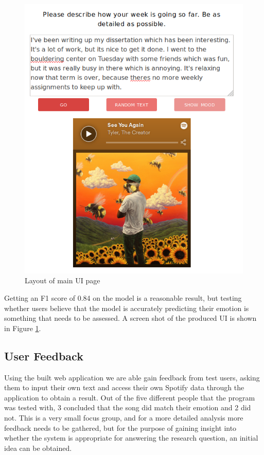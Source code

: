 \begin{figure}[ht]
\centering
\includegraphics[scale=0.4]{implementation/tamara.png}
\caption{Layout of main UI page}
\label{UIlayout}
\end{figure}

Getting an F1 score of 0.84 on the model is a reasonable result, but testing whether users believe that the model is accurately predicting their emotion is something that needs to be assessed. A screen shot of the produced UI is shown in Figure \ref{UIlayout}.
\pagebreak

\subsection{User Feedback}
Using the built web application we are able gain feedback from test users, asking them to input their own text and access their own Spotify data through the application to obtain a result. 
Out of the five different people that the program was tested with, 3 concluded that the song did match their emotion and 2 did not. This is a very small focus group, and for a more detailed analysis more feedback needs to be gathered, but for the purpose of gaining insight into whether the system is appropriate for answering the research question, an initial idea can be obtained.


